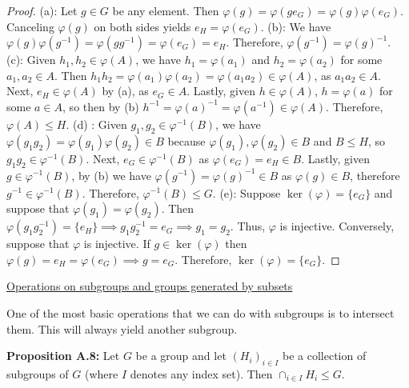 \documentclass[12pt]{article}
\newcommand{\vs}{\vskip10pt}
\begin{document}
	\begin{proof}
		
		(a): Let $g \in G$ be any element. Then $\varphi(g) = \varphi(ge_G) = \varphi(g) \varphi(e_G)$. Canceling $\varphi(g)$ on both sides yields $e_H = \varphi(e_G)$. 
		\vs
		(b): We have $\varphi(g) \varphi(g^{-1}) = \varphi(g g^{-1}) = \varphi(e_G) = e_H$. Therefore, $\varphi(g^{-1}) = \varphi(g)^{-1}$. 
		\vs
		(c): Given $h_1, h_2 \in \varphi(A)$, we have $h_1 = \varphi(a_1)$ and $h_2 = \varphi(a_2)$ for some $a_1, a_2 \in A$. Then $h_1 h_2 = \varphi(a_1) \varphi(a_2) = \varphi(a_1 a_2) \in \varphi(A)$, as $a_1a_2 \in A$. Next, $e_H \in \varphi(A)$ by (a), as $e_G \in A$. Lastly, given $h \in \varphi(A)$, $h = \varphi(a)$ for some $a \in A$, so then by (b) $h^{-1} = \varphi(a)^{-1} = \varphi(a^{-1}) \in \varphi(A)$. Therefore, $\varphi(A) \leq H$. 
		\vs
		(d) : Given $g_1, g_2 \in \varphi^{-1}(B)$, we have $\varphi(g_1 g_2) = \varphi(g_1) \varphi(g_2) \in B$ because $\varphi(g_1), \varphi(g_2) \in B$ and $B \leq H$, so $g_1 g_2 \in \varphi^{-1}(B)$. Next, $e_G \in \varphi^{-1}(B)$ as $\varphi(e_G) = e_H \in B$. Lastly, given $g \in \varphi^{-1}(B)$, by (b) we have $\varphi(g^{-1}) = \varphi(g)^{-1} \in B$ as $\varphi(g) \in B$, therefore $g^{-1} \in \varphi^{-1}(B)$. Therefore, $\varphi^{-1}(B) \leq G$. 
		\vs 
		(e): Suppose $\ker(\varphi) = \{e_G\}$ and suppose that $\varphi(g_1) = \varphi(g_2)$. Then $\varphi(g_1 g_2^{-1}) = \{e_H\} \implies g_1 g_2^{-1} = e_G \implies g_1 = g_2$. Thus, $\varphi$ is injective. Conversely, suppose that $\varphi$ is injective. If $g \in \ker(\varphi)$ then $\varphi(g) = e_H = \varphi(e_G) \implies g = e_G$. Therefore, $\ker(\varphi) = \{e_G\}$. 
		
	\end{proof}
	
	\vs
	
	\underline{Operations on subgroups and groups generated by subsets}
	
	\vs 
	
	One of the most basic operations that we can do with subgroups is to intersect them. This will always yield another subgroup. 
	
	\vs 
	
	\textbf{Proposition A.8:} Let $G$ be a group and let $(H_i)_{i \in I}$ be a collection of subgroups of $G$ (where $I$ denotes any index set). Then $\cap_{i \in I} H_i \leq G$. 
	
	\vs 
	
\end{document}
